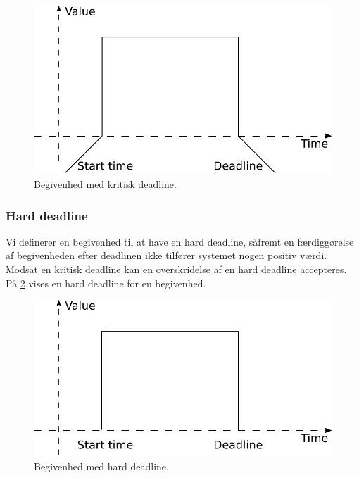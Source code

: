 \begin{figure}
 \begin{center}
  \includegraphics[scale=0.75]{images/critical-deadline}
	\caption{Begivenhed med kritisk deadline.}
	\label{fig:hard-rtp}
\end{center}
\end{figure}


\subsubsection{Hard deadline}
Vi definerer en begivenhed til at have en hard deadline, såfremt en færdiggørelse af begivenheden efter deadlinen ikke tilfører systemet nogen positiv værdi. Modsat en kritisk deadline kan en overskridelse af en hard deadline accepteres. På \cref{fig:hard-dl} vises en hard deadline for en begivenhed. 

\begin{figure}
 \begin{center}
  \includegraphics[scale=0.75]{images/hard-deadline}
	\caption{Begivenhed med hard deadline.}
	\label{fig:hard-dl}
\end{center}
\end{figure}

